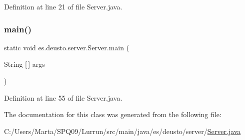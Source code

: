 Definition at line 21 of file Server.\+java.

\mbox{\label{classes_1_1deusto_1_1server_1_1_server_a750bb0d7dbd89246a3602f2e20d03fb5}} 
\subsubsection{\texorpdfstring{main()}{main()}}
{\footnotesize\ttfamily static void es.\+deusto.\+server.\+Server.\+main (\begin{DoxyParamCaption}\item[{String \mbox{[}$\,$\mbox{]}}]{args }\end{DoxyParamCaption})\hspace{0.3cm}{\ttfamily [static]}}



Definition at line 55 of file Server.\+java.



The documentation for this class was generated from the following file\+:\begin{DoxyCompactItemize}
\item 
C\+:/\+Users/\+Marta/\+S\+P\+Q09/\+Lurrun/src/main/java/es/deusto/server/\hyperlink{_server_8java}{Server.\+java}\end{DoxyCompactItemize}
